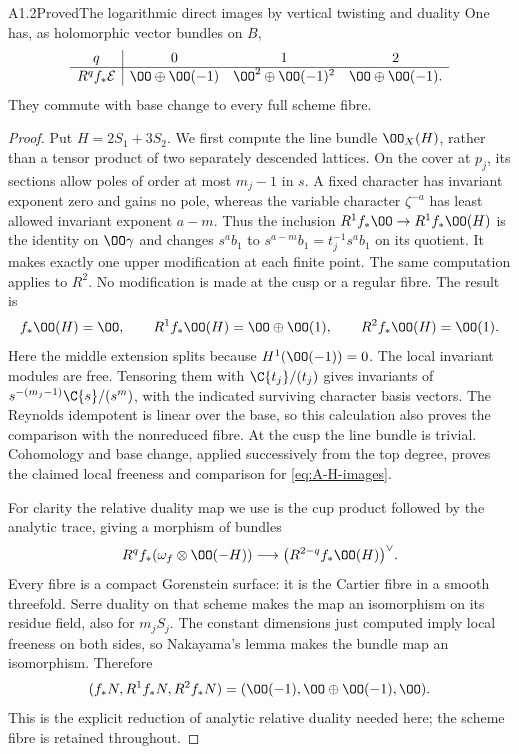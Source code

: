 \begin{claim}{A1.2}{Proved}{The logarithmic direct images by vertical twisting and duality}
One has, as holomorphic vector bundles on $B$,
\[
\begin{array}{c|ccc}
q&0&1&2\\\hline
R^qf_*\mathcal E&\OO\oplus\OO(-1)&
 \OO^2\oplus\OO(-1)^2&\OO\oplus\OO(-1).
\end{array}
\]
They commute with base change to every full scheme fibre.
\end{claim}
\begin{proof}
Put $H=2S_1+3S_2$.  We first compute the line bundle $\OO_X(H)$,
rather than a tensor product of two separately descended lattices.
On the cover at $p_j$, its sections allow poles of order at most $m_j-1$
in $s$.  A fixed character has invariant exponent zero and gains no
pole, whereas the variable character $\zeta^{-a}$ has least allowed
invariant exponent $a-m$.  Thus the inclusion
$R^1f_*\OO\to R^1f_*\OO(H)$ is the identity on $\OO\gamma$ and
changes $s^ab_1$ to $s^{a-m}b_1=t_j^{-1}s^ab_1$ on its quotient.
It makes exactly one upper modification at each finite point.
The same computation applies to $R^2$.  No modification is made at
the cusp or a regular fibre.  The result is
\begin{equation}\label{eq:A-H-images}
f_*\OO(H)=\OO,\qquad
R^1f_*\OO(H)=\OO\oplus\OO(1),\qquad
R^2f_*\OO(H)=\OO(1).
\end{equation}
Here the middle extension splits because $H^1(\OO(-1))=0$.
The local invariant modules are free.  Tensoring them with
$\C\{t_j\}/(t_j)$ gives invariants of
$s^{-(m_j-1)}\C\{s\}/(s^m)$, with the indicated surviving character
basis vectors.  The Reynolds idempotent is linear over the base,
so this calculation also proves the comparison with the nonreduced
fibre.  At the cusp the line bundle is trivial.  Cohomology and base
change, applied successively from the top degree, proves the claimed
local freeness and comparison for \eqref{eq:A-H-images}.

For clarity the relative duality map we use is the cup product followed
by the analytic trace, giving a morphism of bundles
\[
R^qf_*(\omega_f\otimes\OO(-H))\longrightarrow
\bigl(R^{2-q}f_*\OO(H)\bigr)^\vee.
\]
Every fibre is a compact Gorenstein surface: it is the Cartier fibre
in a smooth threefold.  Serre duality on that scheme makes the map
an isomorphism on its residue field, also for $m_jS_j$.  The constant
dimensions just computed imply local freeness on both sides, so
Nakayama's lemma makes the bundle map an isomorphism.  Therefore
\begin{equation}\label{eq:A-N-images}
(f_*N,R^1f_*N,R^2f_*N)
=(\OO(-1),\OO\oplus\OO(-1),\OO).
\end{equation}
This is the explicit reduction of analytic relative duality needed
here; the scheme fibre is retained throughout.


\end{proof}
